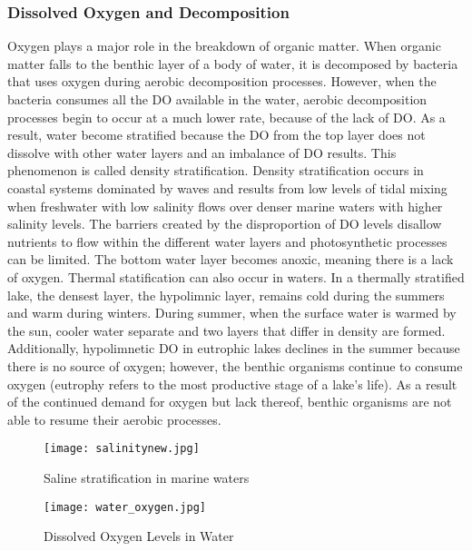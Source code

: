 \subsubsection{Dissolved Oxygen and Decomposition}

Oxygen plays a major role in the breakdown of organic matter. When organic matter falls to the benthic layer of a body of water, it is decomposed by bacteria that uses oxygen during aerobic decomposition processes. However, when the bacteria consumes all the DO available in the water, aerobic decomposition processes begin to occur at a much lower rate, because of the lack of DO. As a result, water become stratified because the DO from the top layer does not dissolve with other water layers and an imbalance of DO results. This phenomenon is called density stratification. Density stratification occurs in coastal systems dominated by waves and results from low levels of tidal mixing when freshwater with low salinity flows over denser marine waters with higher salinity levels. The barriers created by the disproportion of DO levels disallow nutrients to flow within the different water layers and photosynthetic processes can be limited. The bottom water layer becomes anoxic, meaning there is a lack of oxygen. Thermal statification can also occur in waters. In a thermally stratified lake, the densest layer, the hypolimnic layer, remains cold during the summers and warm during winters. During summer, when the surface water is warmed by the sun, cooler water separate and two layers that differ in density are formed. Additionally, hypolimnetic DO in eutrophic lakes declines in the summer because there is no source of oxygen; however, the benthic organisms continue to consume oxygen (eutrophy refers to the most productive stage of a lake's life). As a result of the continued demand for oxygen but lack thereof, benthic organisms are not able to resume their aerobic processes. 


\begin{figure}[!ht]
        \centering
        \texttt{[image: salinitynew.jpg]}
        \caption{Saline stratification in marine waters}
        \label{fig:Salinity}
\end{figure}


\begin{figure}[!ht]
        \centering
        \texttt{[image: water\_oxygen.jpg]}
        \caption{Dissolved Oxygen Levels in Water}
        \label{fig:DO Levels}
\end{figure}

